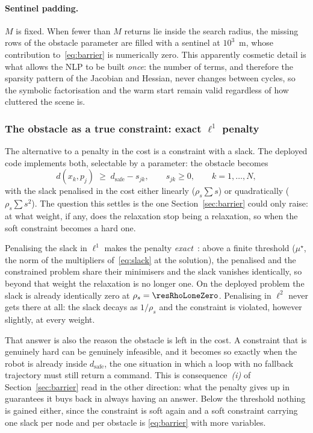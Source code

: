 \documentclass[11pt,a4paper]{article}
\newcommand{\dsafe}{d_{\mathrm{safe}}}
\begin{document}
\paragraph{Sentinel padding.} $M$ is fixed. When fewer than $M$ returns lie inside the search radius, the
missing rows of the obstacle parameter are filled with a sentinel at $10^3$~m, whose contribution
to~\eqref{eq:barrier} is numerically zero. This apparently cosmetic detail is what allows the NLP to be built
\emph{once}: the number of terms, and therefore the sparsity pattern of the Jacobian and Hessian, never
changes between cycles, so the symbolic factorisation and the warm start remain valid regardless of how
cluttered the scene is.

\subsubsection{The obstacle as a true constraint: exact \texorpdfstring{$\ell^1$}{l1} penalty}
\label{sec:l1}

The alternative to a penalty in the cost is a constraint with a slack. The deployed code implements both,
selectable by a parameter: the obstacle becomes
\begin{equation}
  d(x_k,p_j)\;\ge\;\dsafe-s_{jk},\qquad s_{jk}\ge0,\qquad k=1,\dots,N,
  \label{eq:slack}
\end{equation}
with the slack penalised in the cost either linearly ($\rho_s\sum s$) or quadratically ($\rho_s\sum s^2$). The
question this settles is the one Section~\ref{sec:barrier} could only raise: at what weight, if any, does the
relaxation stop being a relaxation, so when the soft constraint becomes a hard one.

Penalising the slack in $\ell^1$ makes the penalty \emph{exact}~\cite{han1979exact,nocedal2006numopt}: above a finite threshold ($\mu^\star$,
the norm of the multipliers of~\eqref{eq:slack} at the solution), the penalised and the constrained
problem share their minimisers and the slack vanishes identically, so beyond that weight the relaxation is no longer one.
On the deployed problem the slack is already identically zero at $\rho_s=\resRhoLoneZero$. Penalising in
$\ell^2$ never gets there at all: the slack decays as $1/\rho_s$ and the constraint is violated, however
slightly, at every weight.

That answer is also the reason the obstacle is left in the cost. A constraint that is genuinely hard can be
genuinely infeasible, and it becomes so exactly when the robot is already inside $\dsafe$, the one
situation in which a loop with no fallback trajectory must still return a command. This is
consequence~\emph{(i)} of Section~\ref{sec:barrier} read in the other direction: what the penalty gives up
in guarantees it buys back in always having an answer. Below the threshold nothing is gained either, since
the constraint is soft again and a soft constraint carrying one slack per node and per obstacle is
\eqref{eq:barrier} with more variables.
\end{document}
